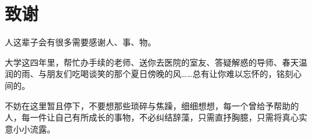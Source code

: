 \cleardoublepage{}
{}
\chapter*{致谢}
人这辈子会有很多需要感谢人、事、物。

大学这四年里，帮忙办手续的老师、送你去医院的室友、答疑解惑的导师、春天温润的雨、与朋友们吃喝谈笑的那个夏日傍晚的风……总有让你难以忘怀的，铭刻心间的。

不妨在这里暂且停下，不要想那些琐碎与焦躁，细细想想，每一个曾给予帮助的人，每一件让自己有所成长的事物，不必纠结辞藻，只需直抒胸臆，只需将真心实意小小流露。
















